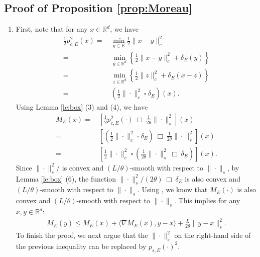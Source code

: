 \documentclass[11 pt]{article}
\begin{document}
	\subsection{Proof of Proposition \ref{prop:Moreau}}
	\label{pf:prop:Moreau}
	\begin{enumerate}[(1)]
		\item First, note that for any $x \in \mathbb{R}^d$, we have
		\begin{align*}
			\frac{1}{2}p^2_{c,E}(x) =\,&\min_{y\in E}\frac{1}{2}\|x-y\|_c^2\\
			=\,&\min_{y\in \mathbb{R}^d}\left\{\frac{1}{2}\|x-y\|_c^2+\delta_E(y)\right\}\\
			=\,&\min_{z\in \mathbb{R}^d}\left\{\frac{1}{2}\|z\|_c^2+\delta_E(x-z)\right\}\tag{Change of variable: $z=x-y$}\\
			=\,&\left(\frac{1}{2}\|\cdot\|_c^2 ~\square~ \delta_E\right)(x).
		\end{align*}
		Using Lemma \ref{le:box} (3) and (4), we have
		\begin{align*}
			M_E(x)=\,& \left[\frac{1}{2}p^2_{c,E}(\cdot) ~\Box~ \frac{1}{2\theta} \| \cdot \|^2_s\right](x)\\
			=\,& \left[\left(\frac{1}{2}\|\cdot\|_c^2 ~\square~ \delta_E\right) ~\Box~ \frac{1}{2\theta} \| \cdot \|^2_s\right](x) \\
			=\,& \left[\frac{1}{2} \| \cdot \|^2_c ~\square~ \left(\frac{1}{2\theta} \| \cdot \|^2_s ~\Box~ \delta_E\right)\right](x).
		\end{align*}
		Since $\| \cdot \|^2_s/$ is convex and $(L/\theta)$-smooth with respect to $\| \cdot \|_s$, by Lemma \ref{le:box} (6), the function $\| \cdot \|^2_s/(2\theta) ~\Box~ \delta_E$ is also convex and $(L/\theta)$-smooth with respect to $\| \cdot \|_s$. Using \cite[Theorem 2.19 and Theorem 5.30]{beck2017first}, we know that $M_E(\cdot)$ is also convex and $(L/\theta)$-smooth with respect to $\| \cdot \|_s$. This implies for any $x,y\in\mathbb{R}^d$:
		\begin{align*}
			M_E(y) \leq M_E(x) + \langle \nabla M_E(x), y-x \rangle + \frac{L}{2\theta} \| y-x\|_s^2. 
		\end{align*}
		To finish the proof, we next argue that the $\|\cdot\|_s^2$ on the right-hand side of the previous inequality can be replaced by $p_{s,E}(\cdot)^2$.
		

\end{enumerate}
\end{document}
